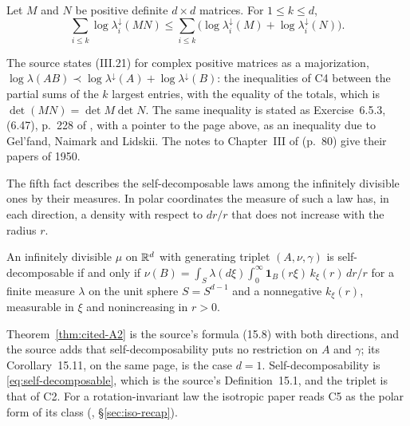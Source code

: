 \begin{theorem}\label{thm:cited-A9}
Let $M$ and $N$ be positive definite $d \times d$ matrices. For $1 \le k \le d$,
\[
  \sum_{i \le k}\log\lambda^\downarrow_i(MN) \le \sum_{i \le k}\bigl(\log\lambda^\downarrow_i(M) +
  \log\lambda^\downarrow_i(N)\bigr) .
\]
\end{theorem}

The source states (III.21) for complex positive matrices as a majorization,
$\log\lambda(AB) \prec \log\lambda^\downarrow(A) + \log\lambda^\downarrow(B)$: the inequalities of C4
between the partial sums of the $k$ largest entries, with the equality of the totals, which is
$\det(MN) = \det M\det N$. The same inequality is stated as Exercise~6.5.3, (6.47), p.~228 of
, with a pointer to the page above, as an inequality due to Gel'fand,
Naimark and Lidskii. The notes to Chapter~III of  (p.~80) give their papers
of 1950.

The fifth fact describes the self-decomposable laws among the infinitely divisible ones by their
\Levy{} measures. In polar coordinates the \Levy{} measure of such a law has, in each direction, a
density with respect to $dr/r$ that does not increase with the radius $r$.

\begin{theorem}\label{thm:cited-A2}
An infinitely divisible $\mu$ on $\mathbb{R}^d$ with generating triplet $(A,\nu,\gamma)$ is
self-decomposable if and only if
$\nu(B)=\int_S\lambda(d\xi)\int_0^\infty\mathbf 1_B(r\xi)\,k_\xi(r)\,dr/r$ for a finite measure
$\lambda$ on the unit sphere $S=S^{d-1}$ and a nonnegative $k_\xi(r)$, measurable in $\xi$ and
nonincreasing in $r>0$.
\end{theorem}

Theorem~\ref{thm:cited-A2} is the source's formula (15.8) with both directions, and the source adds that self-decomposability puts no
restriction on $A$ and $\gamma$; its Corollary~15.11, on the same page, is the case $d = 1$.
Self-decomposability is \ref{eq:self-decomposable}, which is the source's Definition~15.1, and the
triplet is that of C2. For a rotation-invariant law the isotropic paper reads C5 as the polar form of
its class (, \S\ref{sec:iso-recap}).

